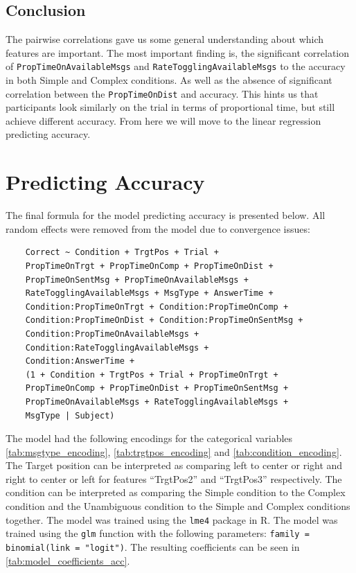 \subsection*{Conclusion}
The pairwise correlations gave us some general understanding about which features are important. The most important finding is, the significant correlation of \texttt{PropTimeOnAvailableMsgs} and \texttt{RateTogglingAvailableMsgs} to the accuracy in both Simple and Complex conditions. As well as the absence of significant correlation between the \texttt{PropTimeOnDist} and accuracy. This hints us that participants look similarly on the trial in terms of proportional time, but still achieve different accuracy. From here we will move to the linear regression predicting accuracy. 















\section{Predicting Accuracy}
\label{sec:accuracy_model}

The final formula for the model predicting accuracy is presented below. All random effects were removed from the model due to convergence issues:
\begin{verbatim}
    Correct ~ Condition + TrgtPos + Trial +
    PropTimeOnTrgt + PropTimeOnComp + PropTimeOnDist +
    PropTimeOnSentMsg + PropTimeOnAvailableMsgs +
    RateTogglingAvailableMsgs + MsgType + AnswerTime +
    Condition:PropTimeOnTrgt + Condition:PropTimeOnComp +
    Condition:PropTimeOnDist + Condition:PropTimeOnSentMsg +
    Condition:PropTimeOnAvailableMsgs +
    Condition:RateTogglingAvailableMsgs +
    Condition:AnswerTime +
    (1 + Condition + TrgtPos + Trial + PropTimeOnTrgt +
    PropTimeOnComp + PropTimeOnDist + PropTimeOnSentMsg +
    PropTimeOnAvailableMsgs + RateTogglingAvailableMsgs +
    MsgType | Subject) 

\end{verbatim}
The model had the following encodings for the categorical variables \autoref{tab:msgtype_encoding}, \autoref{tab:trgtpos_encoding} and \autoref{tab:condition_encoding}. The Target position can be interpreted as comparing left to center or right and right to center or left for features ``TrgtPos2'' and ``TrgtPos3'' respectively. The condition can be interpreted as comparing the Simple condition to the Complex condition and the Unambiguous condition to the Simple and Complex conditions together. The model was trained using the \texttt{lme4} package in R. The model was trained using the \texttt{glm} function with the following parameters: \texttt{family = binomial(link = "logit")}. The resulting coefficients can be seen in \autoref{tab:model_coefficients_acc}. 

